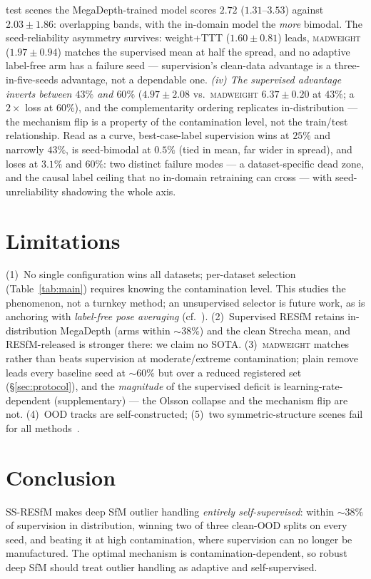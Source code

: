 \documentclass[10pt,twocolumn,letterpaper]{article}
\newcommand{\mad}{\textsc{madweight}}
\begin{document}
test scenes the MegaDepth-trained model scores $2.72$ ($1.31$--$3.53$) against
$2.03\pm1.86$: overlapping bands, with the in-domain model the \emph{more} bimodal.
The seed-reliability asymmetry survives: weight+TTT ($1.60\pm0.81$) leads, \mad{}
($1.97\pm0.94$) matches the supervised mean at half the spread, and no adaptive
label-free arm has a failure seed --- supervision's clean-data advantage is a
three-in-five-seeds advantage, not a dependable one. \emph{(iv) The supervised
advantage inverts between $43\%$ and $60\%$} ($4.97\pm2.08$ vs.\ \mad{}
$6.37\pm0.20$ at $43\%$; a $2\times$ loss at $60\%$), and the complementarity
ordering replicates in-distribution --- the mechanism flip is a property of the
contamination level, not the train/test relationship. Read as a curve, best-case-label supervision wins at $25\%$ and narrowly $43\%$, is
seed-bimodal at $0.5\%$ (tied in mean, far wider in spread), and loses at $3.1\%$ and
$60\%$: two distinct failure modes --- a dataset-specific dead zone, and the causal
label ceiling that no in-domain retraining can cross --- with seed-unreliability
shadowing the whole axis.


\section{Limitations}
(1)~No single configuration wins all datasets; per-dataset selection
(Table~\ref{tab:main}) requires knowing the contamination level. This studies the
phenomenon, not a turnkey method; an unsupervised selector is future work, as is
anchoring with \emph{label-free pose averaging} (cf.~\citealt{vgpa}).
(2)~Supervised RESfM retains in-distribution MegaDepth (arms within $\sim\!38\%$) and the
clean Strecha mean, and RESfM-released is stronger there: we claim no SOTA. (3)~\mad{} matches rather than beats supervision at moderate/extreme
contamination; plain remove leads every baseline seed at $\sim\!60\%$ but over a reduced
registered set (\S\ref{sec:protocol}), and the \emph{magnitude} of the supervised deficit
is learning-rate-dependent (supplementary) --- the Olsson collapse and the mechanism flip
are not. (4)~OOD tracks are self-constructed; (5)~two symmetric-structure scenes fail for all
methods~\citep{resfm}.

\section{Conclusion}
SS-RESfM makes deep SfM outlier handling \emph{entirely self-supervised}: within
$\sim\!38\%$ of supervision in distribution, winning two of three clean-OOD splits on
every seed, and beating it at high contamination, where supervision can no longer be
manufactured. The optimal mechanism is contamination-dependent, so robust deep SfM
should treat outlier handling as adaptive and self-supervised.
\end{document}
